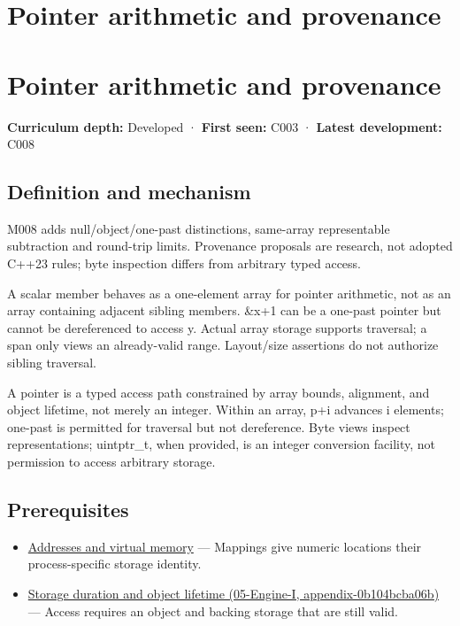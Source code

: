 \hypertarget{appendix-6af5921bc853}{}
\section*{Pointer arithmetic and provenance}
\section{Pointer arithmetic and provenance}\label{appendix-6af5921bc853-pointer-arithmetic-and-provenance}

\textbf{Curriculum depth:} Developed · \textbf{First seen:} C003 · \textbf{Latest development:} C008

\subsection{Definition and mechanism}\label{appendix-6af5921bc853-definition-and-mechanism}

M008 adds null/object/one-past distinctions, same-array representable subtraction and round-trip limits. Provenance proposals are research, not adopted C++23 rules; byte inspection differs from arbitrary typed access.

A scalar member behaves as a one-element array for pointer arithmetic, not as an array containing adjacent sibling members. \&x+1 can be a one-past pointer but cannot be dereferenced to access y. Actual array storage supports traversal; a span only views an already-valid range. Layout/size assertions do not authorize sibling traversal.

A pointer is a typed access path constrained by array bounds, alignment, and object lifetime, not merely an integer. Within an array, p+i advances i elements; one-past is permitted for traversal but not dereference. Byte views inspect representations; uintptr\_t, when provided, is an integer conversion facility, not permission to access arbitrary storage.

\subsection{Prerequisites}\label{appendix-6af5921bc853-prerequisites}

\begin{itemize}
\tightlist
\item
  \hyperref[appendix-18ee4f913c3c]{Addresses and virtual memory} --- Mappings give numeric locations their process-specific storage identity.
\item
  \href{../05-Engine-I/main.pdf\#nameddest=appendix-0b104bcba06b}{Storage duration and object lifetime (05-Engine-I, appendix-0b104bcba06b)} --- Access requires an object and backing storage that are still valid.
\end{itemize}

